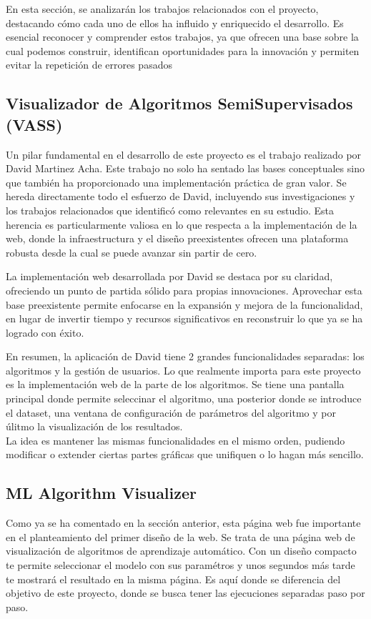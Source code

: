 En esta sección, se analizarán los trabajos relacionados con el proyecto, destacando cómo cada uno de ellos ha influido y enriquecido el desarrollo. Es esencial reconocer y comprender estos trabajos, ya que ofrecen una base sobre la cual podemos construir, identifican oportunidades para la innovación y permiten evitar la repetición de errores pasados
\subsection{Visualizador de Algoritmos SemiSupervisados (VASS)}
Un pilar fundamental en el desarrollo de este proyecto es el trabajo realizado por David Martinez Acha. Este trabajo no solo ha sentado las bases conceptuales sino que también ha proporcionado una implementación práctica de gran valor. Se hereda directamente todo el esfuerzo de David, incluyendo sus investigaciones y los trabajos relacionados que identificó como relevantes en su estudio. Esta herencia es particularmente valiosa en lo que respecta a la implementación de la web, donde la infraestructura y el diseño preexistentes ofrecen una plataforma robusta desde la cual se puede avanzar sin partir de cero.

La implementación web desarrollada por David se destaca por su claridad, ofreciendo un punto de partida sólido para propias innovaciones. Aprovechar esta base preexistente permite enfocarse en la expansión y mejora de la funcionalidad, en lugar de invertir tiempo y recursos significativos en reconstruir lo que ya se ha logrado con éxito.

En resumen, la aplicación de David tiene 2 grandes funcionalidades separadas: los algoritmos y la gestión de usuarios. Lo que realmente importa para este proyecto es la implementación web de la parte de los algoritmos. Se tiene una pantalla principal donde permite seleccinar el algoritmo, una posterior donde se introduce el dataset, una ventana de configuración de parámetros del algoritmo y por úlitmo la visualización de los resultados.\\
La idea es mantener las mismas funcionalidades en el mismo orden, pudiendo modificar o extender ciertas partes gráficas que unifiquen o lo hagan más sencillo.

\subsection{ML Algorithm Visualizer}
Como ya se ha comentado en la sección anterior, esta página web fue importante en el planteamiento del primer diseño de la web. Se trata de una página web de visualización de algoritmos de aprendizaje automático. Con un diseño compacto te permite seleccionar el modelo con sus paramétros y unos segundos más tarde te mostrará el resultado en la misma página. Es aquí donde se diferencia del objetivo de este proyecto, donde se busca tener las ejecuciones separadas paso por paso.

